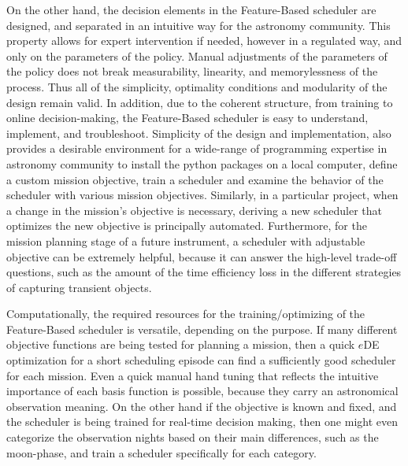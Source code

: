 \documentclass[12pt]{aastex62}
\theoremstyle{definition}
\begin{document}
On the other hand, the decision elements in the Feature-Based scheduler are designed, and separated in an intuitive way for the astronomy community. This property allows for expert intervention if needed, however in a regulated way, and only on the parameters of the policy. Manual adjustments of the parameters of the policy does not break measurability, linearity, and memorylessness of the process. Thus all of the simplicity, optimality conditions and modularity of the design remain valid. In addition, due to the coherent structure, from training to online decision-making, the Feature-Based scheduler is easy to understand, implement, and troubleshoot. Simplicity of the design and implementation, also provides a desirable environment for a wide-range of programming expertise in astronomy community to install the python packages on a local computer, define a custom mission objective, train a scheduler and examine the behavior of the scheduler with various mission objectives. Similarly, in a particular project, when a change in the mission's objective is necessary, deriving a new scheduler that optimizes the new objective is principally automated. Furthermore, for the mission planning stage of a future instrument, a scheduler with adjustable objective can be extremely helpful, because it can answer the high-level trade-off questions, such as the amount of the time efficiency loss in the different strategies of capturing transient objects.

Computationally, the required resources for the training/optimizing of the Feature-Based scheduler is versatile, depending on the purpose. If many different objective functions are being tested for planning a mission, then a quick $e$DE optimization for a short scheduling episode can find a sufficiently good scheduler for each mission. Even a quick manual hand tuning that reflects the intuitive importance of each basis function is possible, because they carry an astronomical observation meaning. On the other hand if the objective is known and fixed, and the scheduler is being trained for real-time decision making, then one might even categorize the observation nights based on their main differences, such as the moon-phase, and train a scheduler specifically for each category. 
\end{document}

